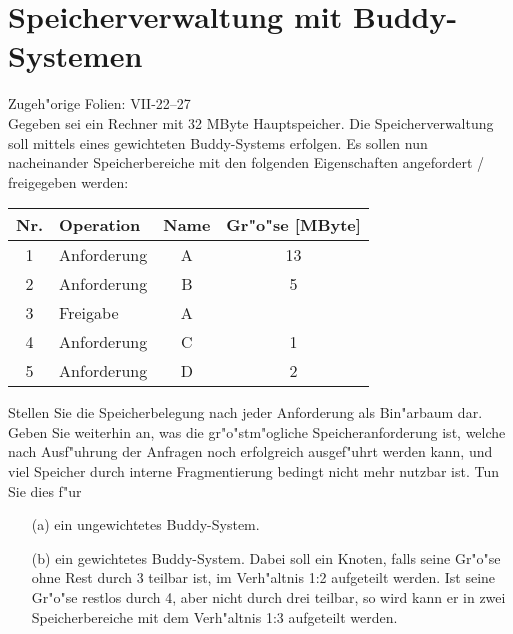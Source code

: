 \section{Speicherverwaltung mit Buddy-Systemen}

Zugeh"orige Folien:  VII-22--27 \\

Gegeben sei ein Rechner mit 32 MByte Hauptspeicher.  Die
Speicherverwaltung soll mittels eines gewichteten Buddy-Systems
erfolgen.  Es sollen nun nacheinander Speicherbereiche mit den
folgenden Eigenschaften angefordert / freigegeben werden:

\begin{center}
  \begin{tabular}{clcc}
    \toprule
    Nr. & Operation   & Name & Gr"o"se [MByte] \\
    \midrule
    1   & Anforderung & A    & 13 \\
    2   & Anforderung & B    & 5  \\
    3   & Freigabe    & A    &    \\
    4   & Anforderung & C    & 1  \\
    5   & Anforderung & D    & 2  \\
    \bottomrule
  \end{tabular}
\end{center}

Stellen Sie die Speicherbelegung nach jeder Anforderung als Bin"arbaum
dar.  Geben Sie weiterhin an, was die gr"o"stm"ogliche
Speicheranforderung ist, welche nach Ausf"uhrung der Anfragen noch
erfolgreich ausgef"uhrt werden kann, und viel Speicher durch interne
Fragmentierung bedingt nicht mehr nutzbar ist.  Tun Sie dies f"ur

\begin{enumerate}
\item[(a)] ein ungewichtetes Buddy-System.
  
\item[(b)] ein gewichtetes Buddy-System.  Dabei soll ein Knoten, falls
  seine Gr"o"se ohne Rest durch 3 teilbar ist, im Verh"altnis 1:2
  aufgeteilt werden.  Ist seine Gr"o"se restlos durch 4, aber nicht
  durch drei teilbar, so wird kann er in zwei Speicherbereiche mit dem
  Verh"altnis 1:3 aufgeteilt werden.
\end{enumerate}
